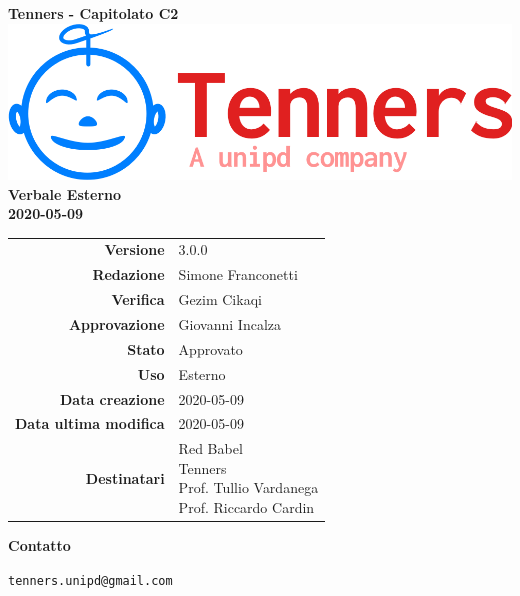 \begin{titlepage}
	\begin{center}
		\large \textbf{Tenners - Capitolato C2}
		\vfill
		\includegraphics[scale = 0.3]{./res/img/logo.png}\\
		\vfill
		\Huge \textbf{Verbale Esterno} \\
		\textbf {2020-05-09}

        \vfill
        \large

        \begin{tabular}{r|l}
        	\textbf{Versione} & 3.0.0 \\
        	\textbf{Redazione} & Simone Franconetti \\
        	\textbf{Verifica} &  Gezim Cikaqi \\
        	\textbf{Approvazione} & Giovanni Incalza \\
        	\textbf{Stato} & Approvato \\
        	\textbf{Uso} &  Esterno\\
        	\textbf{Data creazione} &  2020-05-09\\
        	\textbf{Data ultima modifica} & 2020-05-09 \\
        	\textbf{Destinatari} & \parbox[t]{5cm}{Red Babel\\Tenners \\ Prof. Tullio Vardanega\\ Prof. Riccardo Cardin}
        \end{tabular}
    	\vfill
    	\normalsize
    	\vfill
    	\textbf{Contatto}

    	\texttt{tenners.unipd@gmail.com}

	\end{center}
\end{titlepage}
